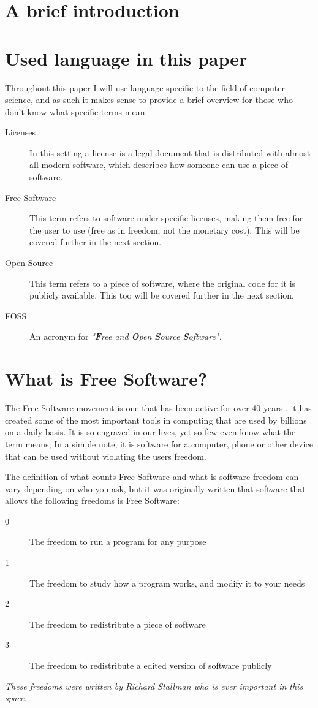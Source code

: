 \documentclass[a4paper,12pt]{article}
\begin{document}
{\setlength{\parindent}{0cm}

\section{A brief introduction}

\section{Used language in this paper} Throughout this paper I will use language specific to the field of computer
science, and as such it makes sense to provide a brief overview for those who don't know what specific terms mean.

\begin{description}
	\item[Licenses] In this setting a license is a legal document that is distributed with
		almost all modern software, which describes how someone can use a piece of software.
	\item[Free Software] This term refers to software under specific licenses, making them
		free for the user to use (free as in freedom, not the monetary cost). This will be covered further
		in the next section.
	\item[Open Source] This term refers to a piece of software, where the original code for it
		is publicly available. This too will be covered further in the next section.
	\item[FOSS] An acronym for \textit{"\textbf{F}ree and \textbf{O}pen \textbf{S}ource \textbf{S}oftware".}
\end{description}

\section{What is Free Software?} The Free Software movement is one that has been active for over 40 years
\cite{GNUmaifesto}, it has created some of the most important tools in computing that are used by billions on a
daily basis.  It is so engraved in our lives, yet so few even know what the term means; In a simple note, it is
software for a computer, phone or other device that can be used without violating the users freedom.

The definition of what counts Free Software and what is software freedom can vary depending on who you ask, but
it was originally written that software that allows the following freedoms is Free Software:

\begin{description}
	\item[0] The freedom to run a program for any purpose \item[1] The freedom to study how a program works,
	and modify it to your needs \item[2] The freedom to redistribute a piece of software \item[3] The freedom
	to redistribute a edited version of software publicly
\end{description} \textit{These freedoms were written by Richard Stallman\cite{FOSSdef} who is ever
	important in this space.}

}
\end{document}
